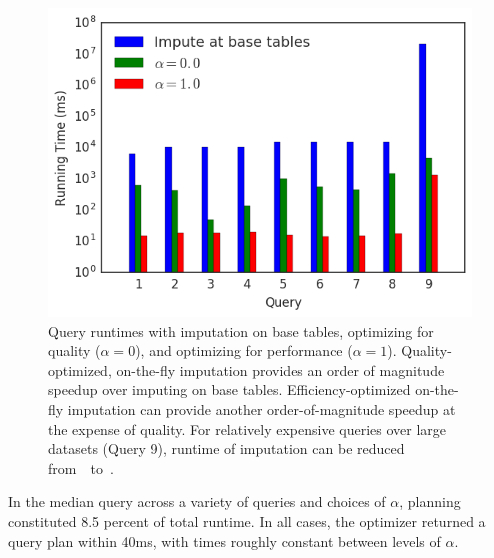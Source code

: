 \begin{figure}
\includegraphics[width=\columnwidth]{figures/running_times_combined_bar.png}
\caption{Query runtimes with imputation on base tables, \ProjectName{}
    optimizing for quality ($\alpha=0$), and \ProjectName{} optimizing for
    performance ($\alpha=1$). Quality-optimized, on-the-fly imputation provides an order of
    magnitude speedup over imputing on base tables. Efficiency-optimized on-the-fly
    imputation can provide another order-of-magnitude speedup at the expense of quality. For
    relatively expensive queries over large datasets (Query 9), runtime of imputation can be reduced
    from~\acsbaseresulthours~to~\acsimputedbzeroresult.}
    
\label{fig:runtimes}
\end{figure}


In the median query across a variety of queries and choices of $\alpha$, planning
constituted 8.5 percent of total runtime. In all cases, the optimizer
returned a query plan within 40ms, with times roughly constant between levels of $\alpha$.



